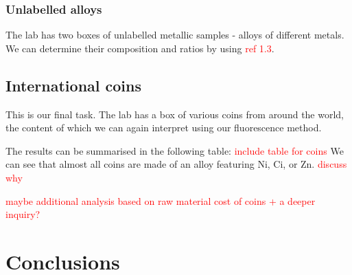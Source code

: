 \documentclass[11pt,a4paper,twoside,onecolumn]{article}
\newcommand{\reminder}[1]{\textcolor{red}{#1}}
\begin{document}
\subsubsection{Unlabelled alloys}
The lab has two boxes of unlabelled metallic samples - alloys of different metals. We can determine their composition and ratios by using \reminder{ref 1.3}.

\subsection{International coins}
This is our final task. The lab has a box of various coins from around the world, the content of which we can again interpret using our fluorescence method.

The results can be summarised in the following table:
\reminder{include table for coins}
We can see that almost all coins are made of an alloy featuring Ni, Ci, or Zn. \reminder{discuss why}

\reminder{maybe additional analysis based on raw material cost of coins + a deeper inquiry?}

\section{Conclusions}
\lipsum[1-5]
\end{document}
